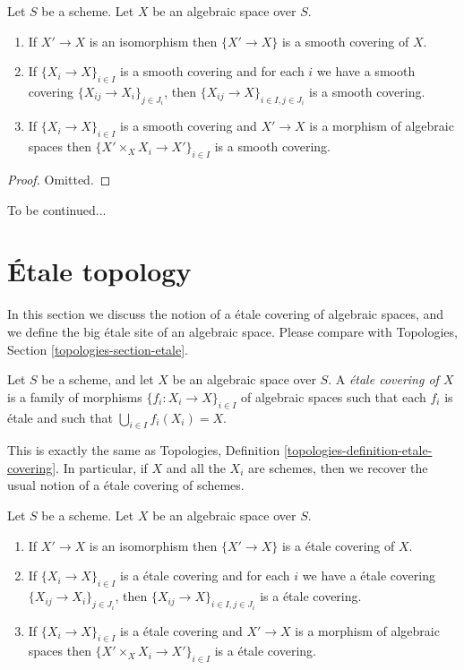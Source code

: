 \begin{lemma}
\label{lemma-smooth}
Let $S$ be a scheme.
Let $X$ be an algebraic space over $S$.
\begin{enumerate}
\item If $X' \to X$ is an isomorphism then $\{X' \to X\}$
is a smooth covering of $X$.
\item If $\{X_i \to X\}_{i\in I}$ is a smooth covering and for each
$i$ we have a smooth covering $\{X_{ij} \to X_i\}_{j\in J_i}$, then
$\{X_{ij} \to X\}_{i \in I, j\in J_i}$ is a smooth covering.
\item If $\{X_i \to X\}_{i\in I}$ is a smooth covering
and $X' \to X$ is a morphism of algebraic spaces then
$\{X' \times_X X_i \to X'\}_{i\in I}$ is a smooth covering.
\end{enumerate}
\end{lemma}

\begin{proof}
Omitted.
\end{proof}

\noindent
To be continued...




\section{\'Etale topology}
\label{section-etale}

\noindent
In this section we discuss the notion of a \'etale covering of
algebraic spaces, and we define the big \'etale site of an
algebraic space. Please compare with
Topologies, Section \ref{topologies-section-etale}.

\begin{definition}
\label{definition-etale-covering}
Let $S$ be a scheme, and let $X$ be an algebraic space over $S$.
A {\it \'etale covering of $X$} is a family of morphisms
$\{f_i : X_i \to X\}_{i \in I}$ of algebraic spaces
such that each $f_i$ is \'etale
and such that $\bigcup_{i \in I} f_i(X_i) = X$.
\end{definition}

\noindent
This is exactly the same as
Topologies, Definition \ref{topologies-definition-etale-covering}.
In particular, if $X$ and all the $X_i$ are schemes, then we recover the
usual notion of a \'etale covering of schemes.

\begin{lemma}
\label{lemma-etale}
Let $S$ be a scheme.
Let $X$ be an algebraic space over $S$.
\begin{enumerate}
\item If $X' \to X$ is an isomorphism then $\{X' \to X\}$
is a \'etale covering of $X$.
\item If $\{X_i \to X\}_{i\in I}$ is a \'etale covering and for each
$i$ we have a \'etale covering $\{X_{ij} \to X_i\}_{j\in J_i}$, then
$\{X_{ij} \to X\}_{i \in I, j\in J_i}$ is a \'etale covering.
\item If $\{X_i \to X\}_{i\in I}$ is a \'etale covering
and $X' \to X$ is a morphism of algebraic spaces then
$\{X' \times_X X_i \to X'\}_{i\in I}$ is a \'etale covering.
\end{enumerate}
\end{lemma}

